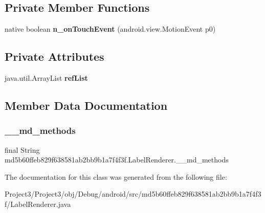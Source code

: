 \subsection*{Private Member Functions}
\begin{DoxyCompactItemize}
\item 
\mbox{\label{classmd5b60ffeb829f638581ab2bb9b1a7f4f3f_1_1LabelRenderer_a5d58dc5f8f8a367964cfd8fbd30be3f0}} 
native boolean {\bfseries n\+\_\+on\+Touch\+Event} (android.\+view.\+Motion\+Event p0)
\end{DoxyCompactItemize}
\subsection*{Private Attributes}
\begin{DoxyCompactItemize}
\item 
\mbox{\label{classmd5b60ffeb829f638581ab2bb9b1a7f4f3f_1_1LabelRenderer_aff060607c57202cbc808598219736919}} 
java.\+util.\+Array\+List {\bfseries ref\+List}
\end{DoxyCompactItemize}


\subsection{Member Data Documentation}
\mbox{\label{classmd5b60ffeb829f638581ab2bb9b1a7f4f3f_1_1LabelRenderer_a6d75a8c95caaa11a9bbc9581bb0151b3}} 
\subsubsection{\texorpdfstring{\+\_\+\+\_\+md\+\_\+methods}{\_\_md\_methods}}
{\footnotesize\ttfamily final String md5b60ffeb829f638581ab2bb9b1a7f4f3f.\+Label\+Renderer.\+\_\+\+\_\+md\+\_\+methods\hspace{0.3cm}{\ttfamily [static]}}



The documentation for this class was generated from the following file\+:\begin{DoxyCompactItemize}
\item 
Project3/\+Project3/obj/\+Debug/android/src/md5b60ffeb829f638581ab2bb9b1a7f4f3f/Label\+Renderer.\+java\end{DoxyCompactItemize}
